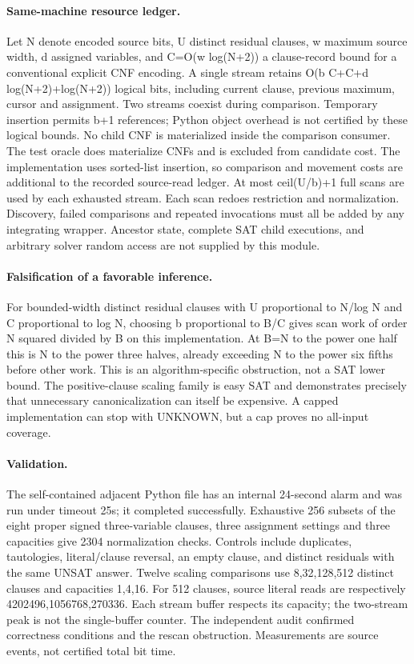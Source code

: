 \documentclass{article}
\begin{document}
\paragraph{Same-machine resource ledger.}
Let N denote encoded source bits, U distinct residual clauses, w maximum
source width, d assigned variables, and C=O(w log(N+2)) a clause-record bound
for a conventional explicit CNF encoding. A single stream retains
O(b C+C+d log(N+2)+log(N+2)) logical bits, including current clause,
previous maximum, cursor and assignment. Two streams coexist during
comparison. Temporary insertion permits b+1 references; Python object
overhead is not certified by these logical bounds.
No child CNF is materialized inside the comparison consumer.
The test oracle does materialize CNFs and is excluded from candidate cost.
The implementation uses sorted-list insertion, so comparison and movement
costs are additional to the recorded source-read ledger.
At most ceil(U/b)+1 full scans are used by each exhausted stream.
Each scan redoes restriction and normalization. Discovery, failed
comparisons and repeated invocations must all be added by any integrating
wrapper. Ancestor state, complete SAT child executions, and arbitrary
solver random access are not supplied by this module.

\paragraph{Falsification of a favorable inference.}
For bounded-width distinct residual clauses with U proportional to
N/log N and C proportional to log N, choosing b proportional to B/C gives
scan work of order N squared divided by B on this implementation.
At B=N to the power one half this is N to the power three halves,
already exceeding N to the power six fifths before other work.
This is an algorithm-specific obstruction, not a SAT lower bound.
The positive-clause scaling family is easy SAT and demonstrates precisely
that unnecessary canonicalization can itself be expensive.
A capped implementation can stop with UNKNOWN, but a cap proves no
all-input coverage.

\paragraph{Validation.}
The self-contained adjacent Python file has an internal 24-second alarm
and was run under timeout 25s; it completed successfully.
Exhaustive 256 subsets of the eight proper signed three-variable clauses,
three assignment settings and three capacities give 2304 normalization
checks. Controls include duplicates, tautologies, literal/clause reversal,
an empty clause, and distinct residuals with the same UNSAT answer.
Twelve scaling comparisons use 8,32,128,512 distinct clauses and capacities
1,4,16. For 512 clauses, source literal reads are respectively
4202496,1056768,270336. Each stream buffer respects its capacity;
the two-stream peak is not the single-buffer counter.
The independent audit confirmed correctness conditions and the rescan
obstruction. Measurements are source events, not certified total bit time.
\end{document}
